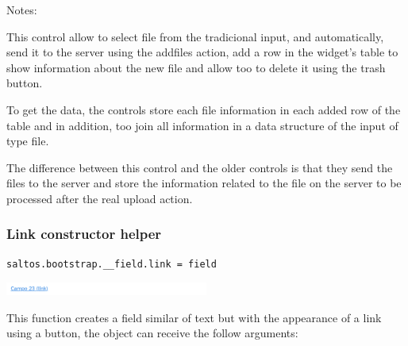 \documentclass[a4paper]{article}
\begin{document}
Notes:

This control allow to select file from the tradicional input, and automatically, send it
to the server using the addfiles action, add a row in the widget's table to show information
about the new file and allow too to delete it using the trash button.

To get the data, the controls store each file information in each added row of the table and
in addition, too join all information in a data structure of the input of type file.

The difference between this control and the older controls is that they send the files to
the server and store the information related to the file on the server to be processed after
the real upload action.

\hypertarget{toc70}{}
\subsubsection{Link constructor helper}

\begin{lstlisting}
saltos.bootstrap.__field.link = field
\end{lstlisting}

\begin{center}\includegraphics[width=0.5\textwidth]{../ujest/snaps/test-bootstrap-js-bootstrap-campo-23-link-1-snap.png}\end{center}

This function creates a field similar of text but with the appearance of a link using a button,
the object can receive the follow arguments:
\end{document}
